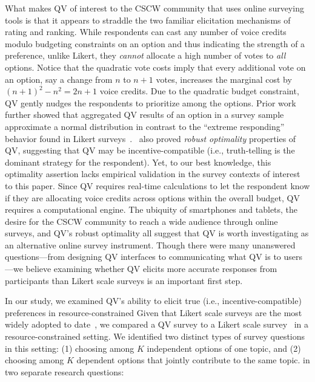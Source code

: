 {{What makes QV of interest to the CSCW community that uses online surveying tools is that it appears to straddle the two familiar elicitation mechanisms of rating and ranking. While respondents can cast any number of voice credits modulo budgeting constraints on an option and thus indicating the strength of a preference, unlike Likert, they \textit{cannot} allocate a high number of votes to \textit{all} options. Notice that the quadratic vote costs imply that every additional vote on an option, say a change from $n$ to $n+1$ votes, increases the marginal cost by $(n+1)^2-n^2=2n+1$ voice credits. Due to the quadratic budget constraint, QV gently nudges the respondents to prioritize among the options. Prior work further showed that aggregated QV results of an option in a survey sample approximate a normal distribution in contrast to  the ``extreme responding'' behavior found in Likert surveys~\cite{quarfoot2017quadratic}.~\textcite{Lalley2018} also proved \textit{robust optimality} properties of QV, suggesting that QV may be incentive-compatible (i.e., truth-telling is the dominant strategy for the respondent). Yet, to our best knowledge, this optimality assertion lacks empirical validation in the survey contexts of interest to this paper. Since QV requires real-time calculations to let the respondent know if they are allocating voice credits across options within the overall budget, QV requires a computational engine. The ubiquity of smartphones and tablets, the desire for the CSCW community to reach a wide audience through online surveys, and QV's robust optimality all suggest that QV is worth investigating as an alternative online survey instrument. Though there were many unanswered questions---from designing QV interfaces to communicating what QV is to users---we believe examining whether QV elicits more accurate responses from participants than Likert scale surveys is an important first step.}}


In our study, we examined QV's ability to elicit true (i.e., incentive-compatible) preferences in resource-constrained {} Given that Likert scale surveys are the most widely adopted to date~\cite{moors2016two}, we compared a QV survey to a Likert scale survey~\cite{likert1932technique} in a resource-constrained setting. We identified two distinct types of survey questions in this setting: (1) choosing among $K$ independent options of one topic, and (2) choosing among $K$ dependent options that jointly contribute to the same topic. {} in two separate research questions:

